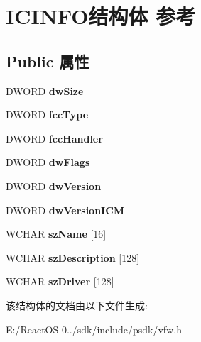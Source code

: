 \hypertarget{struct_i_c_i_n_f_o}{}\section{I\+C\+I\+N\+F\+O结构体 参考}
\label{struct_i_c_i_n_f_o}
\subsection*{Public 属性}
\begin{DoxyCompactItemize}
\item 
\mbox{\label{struct_i_c_i_n_f_o_a0f162138bbb7655154794989038a7a27}} 
D\+W\+O\+RD {\bfseries dw\+Size}
\item 
\mbox{\label{struct_i_c_i_n_f_o_a43928c9f556e621922834b34821ea420}} 
D\+W\+O\+RD {\bfseries fcc\+Type}
\item 
\mbox{\label{struct_i_c_i_n_f_o_a72e6964f8eb58ec52836019fb7f4e4cf}} 
D\+W\+O\+RD {\bfseries fcc\+Handler}
\item 
\mbox{\label{struct_i_c_i_n_f_o_a4b21689e3e00efd6336406eff797f470}} 
D\+W\+O\+RD {\bfseries dw\+Flags}
\item 
\mbox{\label{struct_i_c_i_n_f_o_a669e0c5ac19380142fbee9dc37a1a92e}} 
D\+W\+O\+RD {\bfseries dw\+Version}
\item 
\mbox{\label{struct_i_c_i_n_f_o_a1163dcab8cb3bf5d09b556b1dc9e3971}} 
D\+W\+O\+RD {\bfseries dw\+Version\+I\+CM}
\item 
\mbox{\label{struct_i_c_i_n_f_o_a9a57c218c5825c2357aa5d36ce4bd70c}} 
W\+C\+H\+AR {\bfseries sz\+Name} \mbox{[}16\mbox{]}
\item 
\mbox{\label{struct_i_c_i_n_f_o_a927409e153e8812f80045f729ec964a3}} 
W\+C\+H\+AR {\bfseries sz\+Description} \mbox{[}128\mbox{]}
\item 
\mbox{\label{struct_i_c_i_n_f_o_a0c9a25a816e0e04b4c608175a416b6d7}} 
W\+C\+H\+AR {\bfseries sz\+Driver} \mbox{[}128\mbox{]}
\end{DoxyCompactItemize}


该结构体的文档由以下文件生成\+:\begin{DoxyCompactItemize}
\item 
E\+:/\+React\+O\+S-\/0../sdk/include/psdk/vfw.\+h\end{DoxyCompactItemize}
